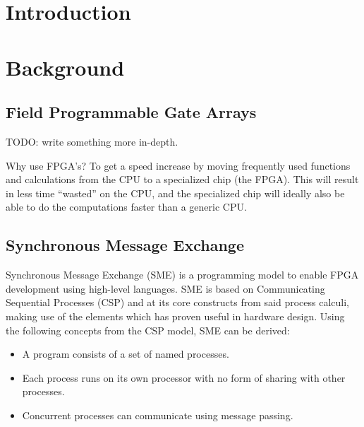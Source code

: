 \documentclass[a4paper]{article}
\date{}
\title{}
\begin{document}
\maketitle
\tableofcontents
\newpage
\section{Introduction}
\label{sec:org95c2bf5}

\section{Background}
\label{sec:org3a96002}

\subsection{Field Programmable Gate Arrays}
\label{sec:orgcd62b25}
TODO: write something more in-depth.

Why use FPGA's? To get a speed increase by moving frequently used functions and calculations from the CPU to a specialized chip (the FPGA).
This will result in less time ``wasted'' on the CPU, and the specialized chip will ideally also be able to do the computations faster than a generic CPU.

\subsection{Synchronous Message Exchange}
\label{SME}
Synchronous Message Exchange (SME) is a programming model to enable FPGA development using high-level languages. SME is based on Communicating Sequential Processes (CSP) and at its core constructs from said process calculi, making use of the elements which has proven useful in hardware design\cite{sme}. Using the following concepts from the CSP model\cite{CSP}, SME can be derived:

\begin{itemize}
\item A program consists of a set of named processes.
\item Each process runs on its own processor with no form of sharing with other processes.
\item Concurrent processes can communicate using message passing.
\end{itemize}
\end{document}
